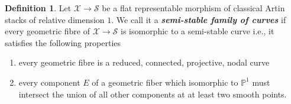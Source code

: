 \documentclass[11pt]{amsart}
\theoremstyle{plain}
\numberwithin{equation}{section}
\theoremstyle{definition}
\newtheorem{Def}{Definition}[section]
\theoremstyle{plain}
\begin{document}
\smallskip

\begin{Def}
Let $\mathcal X\longrightarrow \mathcal{S}$ be a flat representable morphism of classical Artin stacks of relative dimension $1$. We call it a \emph{\bfseries semi-stable family of curves} if every geometric fibre of $\mathcal X\longrightarrow \mathcal{S}$ is isomorphic to a semi-stable curve i.e., it satisfies the following properties
\begin{enumerate}
\item every geometric fibre is a reduced, connected, projective, nodal curve
\item every component $E$ of a geometric fiber which isomorphic to $\mathbb P^1$ must intersect 
the union of all other components at at least two smooth points.   
\end{enumerate}
\end{Def}

\smallskip
\end{document}
